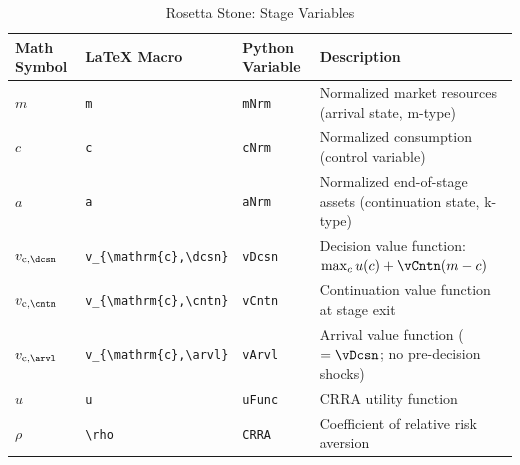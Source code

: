 \documentclass[titlepage, headings=optiontotocandhead]{econark}
\begin{document}
\begin{table}[h]
\caption{Rosetta Stone:  Stage Variables}
\label{tab:rosetta-cons-noshocks}
\begin{center}
\begin{tabular}{l|l|l|l}
Math Symbol & \LaTeX{} Macro & Python Variable & Description \\
\hline
$m$        & \verb|m|        & \texttt{mNrm}        & Normalized market resources (arrival state, m-type) \\
$c$        & \verb|c|        & \texttt{cNrm}        & Normalized consumption (control variable) \\
$a$        & \verb|a|        & \texttt{aNrm}        & Normalized end-of-stage assets (continuation state, k-type) \\
$v_{\mathrm{c},\dcsn}$ & \verb|v_{\mathrm{c},\dcsn}| & \texttt{vDcsn} & Decision value function: $\max_{c} u(c) + \vCntn(m - c)$ \\
$v_{\mathrm{c},\cntn}$ & \verb|v_{\mathrm{c},\cntn}| & \texttt{vCntn} & Continuation value function at stage exit \\
$v_{\mathrm{c},\arvl}$ & \verb|v_{\mathrm{c},\arvl}| & \texttt{vArvl} & Arrival value function ($= \vDcsn$; no pre-decision shocks) \\
$u$       & \verb|u|       & \texttt{uFunc}       & CRRA utility function \\
$\rho$        & \verb|\rho|        & \texttt{CRRA}        & Coefficient of relative risk aversion \\
\hline
\end{tabular}
\end{center}
\end{table}
\end{document}

